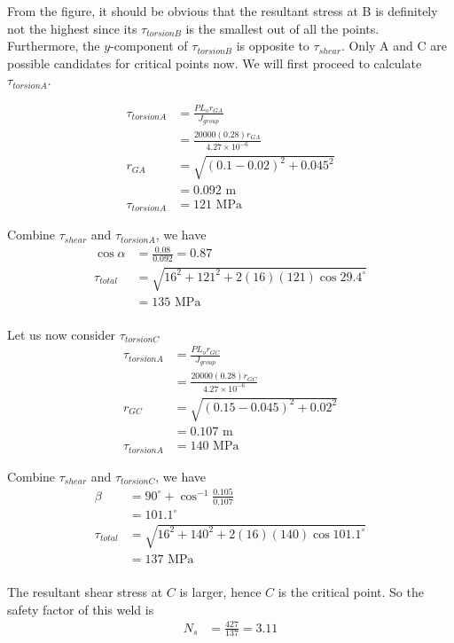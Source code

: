 \documentclass[
10pt,
a4paper,
openany,
svgnames,
]{book}
\begin{document}
\begin{solution}
  From the figure, it should be obvious that the resultant stress at B is definitely not the highest since its $\tau_{torsionB}$ is the smallest out of all the points. Furthermore, the $y$-component of $\tau_{torsionB}$ is opposite to $\tau_{shear}$. Only A and C are possible candidates for critical points now. We will first proceed to calculate $\tau_{torsionA}$.

  \begin{align*}
    \tau_{torsionA} &= \frac{P L_o r_{GA}}{J_{group}} \\
                    &=\frac{20000(0.28) r_{GA}}{4.27 \times 10^{-6}} \\[1em]
    r_{GA} &= \sqrt{(0.1 - 0.02)^2 + 0.045^2} \\
                    &= 0.092 \text{ m} \\[1em]
    \tau_{torsionA} &= 121 \text{ MPa}
  \end{align*}

  Combine $\tau_{shear}$ and $\tau_{torsionA}$, we have
  \begin{align*}
    \cos \alpha &=  \frac{0.08}{0.092} = 0.87 \\
    \tau_{total} &= \sqrt{ 16^2 + 121^2 + 2(16)(121) \cos 29.4^{\circ} } \\
           &= 135 \text{ MPa} \\[1em]
  \end{align*}
  
  Let us now consider $\tau_{torsionC}$
  \begin{align*}
    \tau_{torsionA} &= \frac{P L_o r_{GC}}{J_{group}} \\
                    &=\frac{20000(0.28) r_{GC}}{4.27 \times 10^{-6}} \\[1em]
    r_{GC} &= \sqrt{(0.15 - 0.045)^2 + 0.02^2} \\
                    &= 0.107 \text{ m} \\[1em]
    \tau_{torsionA} &= 140 \text{ MPa}
  \end{align*}

  Combine $\tau_{shear}$ and $\tau_{torsionC}$, we have
  \begin{align*}
    \beta &= 90^{\circ} + \cos^{-1} \frac{0.105}{0.107} \\
          &= 101.1^{\circ} \\[1em]
    \tau_{total} &= \sqrt{ 16^2 + 140^2 + 2(16)(140) \cos 101.1^{\circ} } \\
          &= 137 \text{ MPa} \\[1em]
  \end{align*}

  The resultant shear stress at $C$ is larger, hence $C$ is the critical point. So the safety factor of this weld is
  \begin{align*}  
    N_s &= \frac{427}{137} = 3.11
  \end{align*}
\end{solution}
\end{document}
